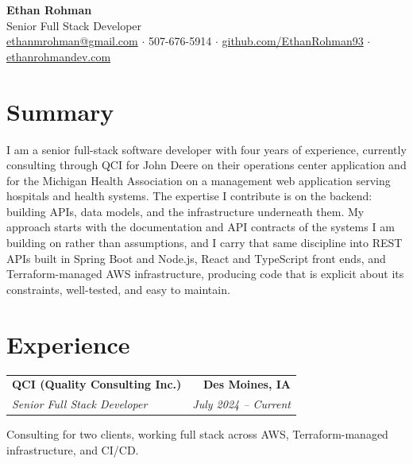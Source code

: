 \documentclass[11pt,letterpaper]{article}
\makeatletter
\newcommand{\entry}[4]{%
  \noindent\begin{tabular*}{\textwidth}{@{}l@{\extracolsep{\fill}}r@{}}
    \textbf{#1} & \textbf{#2} \\
    \textit{#3} & \textit{#4} \\
  \end{tabular*}%
  \par\vspace{2pt}%
}
\makeatother
\begin{document}
\begin{center}
  {\LARGE\bfseries Ethan Rohman}\\[2pt]
  {\normalsize Senior Full Stack Developer}\\[3pt]
  \small
  \href{mailto:ethanmrohman@gmail.com}{ethanmrohman@gmail.com} $\cdot$
  507-676-5914 $\cdot$
  \href{https://github.com/EthanRohman93}{github.com/EthanRohman93} $\cdot$
  \href{https://ethanrohmandev.com}{ethanrohmandev.com}
\end{center}

\section{Summary}
I am a senior full-stack software developer with four years of experience, currently
consulting through QCI for John Deere on their operations center application and
for the Michigan Health Association on a management web application serving
hospitals and health systems. The expertise I contribute is on the backend:
building APIs, data models, and the infrastructure underneath them. My
approach starts with the documentation and API contracts of the systems I am
building on rather than assumptions, and I carry that same discipline into
REST APIs built in Spring Boot and Node.js, React and TypeScript front ends,
and Terraform-managed AWS infrastructure, producing code that is explicit
about its constraints, well-tested, and easy to maintain.

\section{Experience}

\entry{QCI (Quality Consulting Inc.)}{Des Moines, IA}
      {Senior Full Stack Developer}{July 2024 -- Current}

\noindent Consulting for two clients, working full stack across AWS,
Terraform-managed infrastructure, and CI/CD.
\end{document}
